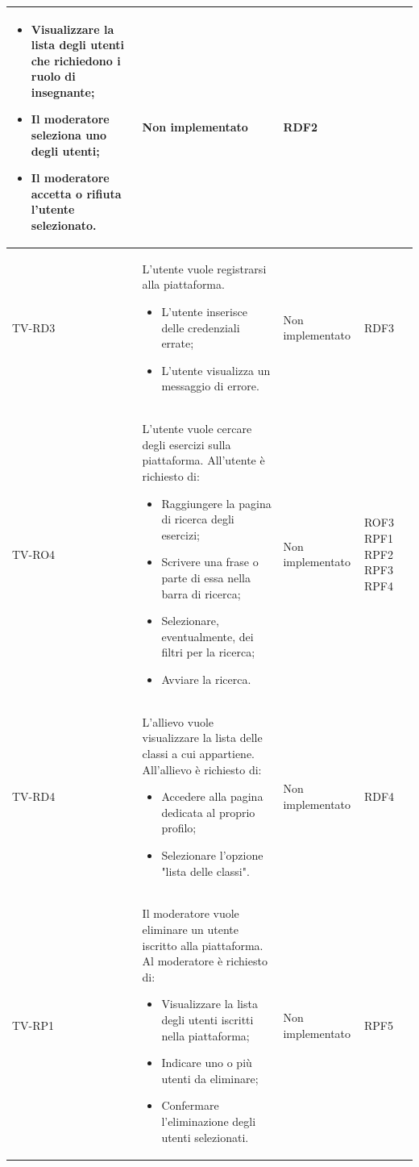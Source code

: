 \begin{longtable}{|>{\centering\arraybackslash}m{1.6cm}|>{\centering\arraybackslash}m{6.41cm}|>{\centering\arraybackslash}m{3.1cm} | >{\centering\arraybackslash}m{2.6cm}|}
\begin{itemize}
			\item Visualizzare la lista degli utenti che richiedono i  ruolo di insegnante;
			\item Il moderatore seleziona uno degli utenti;
			\item Il moderatore accetta o rifiuta l'utente selezionato.
		\end{itemize}& Non implementato  & RDF2 \\ \hline
		  \rowcolor{LightGray}
		TV-RD3 & L'utente vuole registrarsi alla piattaforma. 
		\begin{itemize}
			\item L'utente inserisce delle credenziali errate;
			\item L'utente visualizza un messaggio di errore.
		\end{itemize}& Non implementato  & RDF3 \\ \hline
		TV-RO4 & L'utente vuole cercare degli esercizi sulla piattaforma. All'utente è richiesto di:
		\begin{itemize}
			\item Raggiungere la pagina di ricerca degli esercizi;
			\item Scrivere una frase o parte di essa nella barra di ricerca;
			\item Selezionare, eventualmente, dei filtri per la ricerca;
			\item Avviare la ricerca.
		\end{itemize}& Non implementato  & ROF3 RPF1 RPF2 RPF3 RPF4\\ \hline
		  \rowcolor{LightGray}
		TV-RD4 & L'allievo vuole visualizzare la lista delle classi a cui appartiene. All'allievo è richiesto di: 
		\begin{itemize}
			\item Accedere alla pagina dedicata al proprio profilo;
			\item Selezionare l'opzione "lista delle classi".
		\end{itemize}& Non implementato  & RDF4 \\ \hline
		TV-RP1 & Il moderatore vuole eliminare un utente iscritto alla piattaforma. Al moderatore è richiesto di: 
		\begin{itemize}
			\item Visualizzare la lista degli utenti iscritti nella piattaforma;
			\item Indicare uno o più utenti da eliminare;
			\item Confermare l'eliminazione degli utenti  selezionati.
		\end{itemize}& Non implementato  & RPF5 \\ \hline

\end{longtable}

